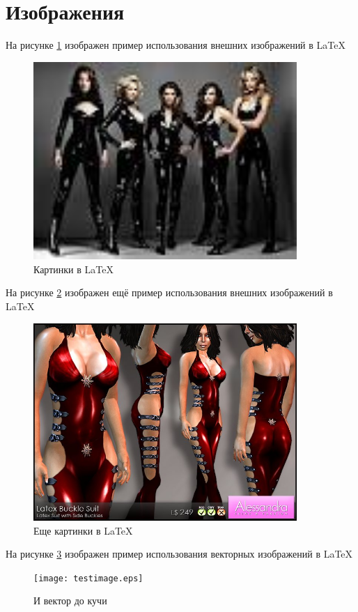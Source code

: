 \section{Изображения}
На рисунке \ref{f:1} изображен пример использования внешних изображений в LaTeX

\begin{figure}[h]
\begin{center}
\includegraphics[width=100mm]{testimage.jpg}
\end{center}
\caption{Картинки в LaTeX}
\label{f:1}
\end{figure}
На рисунке \ref{f:2} изображен ещё пример использования внешних изображений в LaTeX
\begin{figure}[h!]
\begin{center}
\includegraphics[width=100mm]{testimage2.png}
\end{center} 
\caption{Еще картинки в LaTeX}
\label{f:2}
\end{figure}

На рисунке \ref{f:3} изображен пример использования векторных изображений в LaTeX
\begin{figure}[h!]
\begin{center}
\texttt{[image: testimage.eps]}
\end{center} 
\caption{И вектор до кучи}
\label{f:3}
\end{figure}